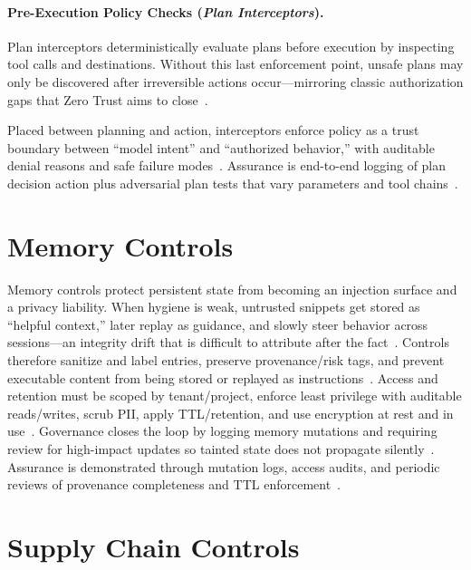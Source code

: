 \begin{TNtwocol}
  \paragraph{Pre-Execution Policy Checks (\emph{Plan Interceptors}).}
  Plan interceptors deterministically evaluate plans before execution by inspecting tool calls and destinations. Without this last enforcement point, unsafe plans may only be discovered after irreversible actions occur—mirroring classic authorization gaps that Zero Trust aims to close~\cite{nist-sp800-207,nist-sp800-53b}.

  Placed between planning and action, interceptors enforce policy as a trust boundary between “model intent” and “authorized behavior,” with auditable denial reasons and safe failure modes~\cite{nist-sp800-207,nist-sp800-53b}. Assurance is end-to-end logging of plan \rightarrow decision \rightarrow action plus adversarial plan tests that vary parameters and tool chains~\cite{nist-sp800-207,nist-sp800-53b}.

  \section{Memory Controls}
  Memory controls protect persistent state from becoming an injection surface and a privacy liability. When hygiene is weak, untrusted snippets get stored as “helpful context,” later replay as guidance, and slowly steer behavior across sessions—an integrity drift that is difficult to attribute after the fact~\cite{nist-airmf-100-1,nist-genai-600-1}. Controls therefore sanitize and label entries, preserve provenance/risk tags, and prevent executable content from being stored or replayed as instructions~\cite{nist-airmf-100-1,nist-genai-600-1}. Access and retention must be scoped by tenant/project, enforce least privilege with auditable reads/writes, scrub PII, apply TTL/retention, and use encryption at rest and in use~\cite{nist-sp800-53b,nist-genai-600-1}. Governance closes the loop by logging memory mutations and requiring review for high-impact updates so tainted state does not propagate silently~\cite{nist-sp800-53b,nist-airmf-100-1}. Assurance is demonstrated through mutation logs, access audits, and periodic reviews of provenance completeness and TTL enforcement~\cite{nist-sp800-53b,nist-genai-600-1}.

  \section{Supply Chain Controls}


\end{TNtwocol}
